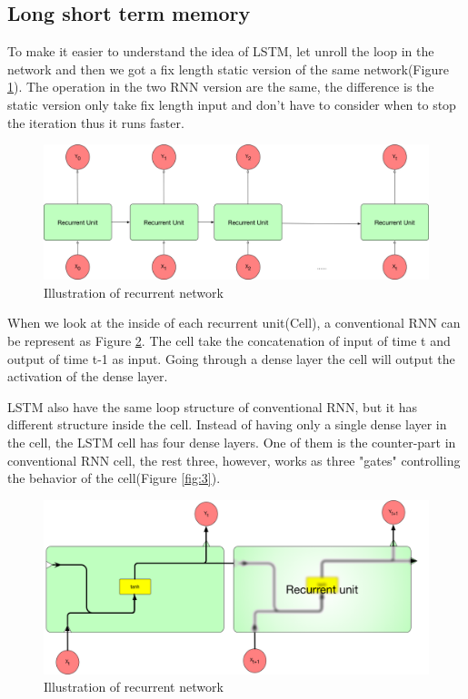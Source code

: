 \subsection{Long short term memory}
To make it easier to understand the idea of LSTM, let unroll the loop in the network and then we got a fix length static version of the same network(Figure \ref{fig:1}). The operation in the two RNN version are the same, the difference is the static version only take fix length input and don't have to consider when to stop the iteration thus it runs faster.\par
\begin{figure}[h] 
	\centering
	\includegraphics[width=6.0in]{Figures/recurrent2}
	\caption[unrolled recurrent network]{Illustration of recurrent network}
	\label{fig:1}
\end{figure}

When we look at the inside of each recurrent unit(Cell), a conventional RNN can be represent as Figure \ref{fig:2}. The cell take the concatenation of input of time t and output of time t-1 as input. Going through a dense layer the cell will output the activation of the dense layer.\par  

LSTM also have the same loop structure of conventional RNN, but it has different structure inside the cell. Instead of having only a single dense layer in the cell, the LSTM cell has four dense layers. One of them is the counter-part in conventional RNN cell, the rest three, however, works as three "gates" controlling the behavior of the cell(Figure \ref{fig:3}).\par 

\begin{figure}[h] 
	\centering
	\includegraphics[width=6.0in]{Figures/recurrent3}
	\caption[Detail inside recurrent unit]{Illustration of recurrent network}
	\label{fig:2}
\end{figure}


